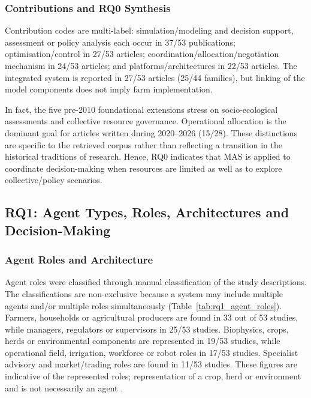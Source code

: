 \documentclass[11pt,a4paper]{article}
\begin{document}
\subsubsection{Contributions and RQ0 Synthesis}

Contribution codes are multi-label: simulation/modeling and decision support, assessment or policy analysis each occur in 37/53 publications; optimisation/control in 27/53 articles; coordination/allocation/negotiation mechanism in 24/53 articles; and platforms/architectures in 22/53 articles. The integrated system is reported in 27/53 articles (25/44 families), but linking of the model components does not imply farm implementation.

In fact, the five pre-2010 foundational extensions stress on socio-ecological
assessments and collective resource governance. Operational
allocation is the dominant goal for articles written during 2020–2026 (15/28). These distinctions are specific to the retrieved corpus rather than reflecting a transition in the historical traditions of research. Hence, RQ0 indicates that MAS is applied to coordinate decision-making when resources are limited as well as to explore collective/policy scenarios.




\subsection{RQ1: Agent Types, Roles, Architectures and Decision-Making}

\subsubsection{Agent Roles and Architecture}

Agent roles were classified through manual classification of the study descriptions. The classifications are non-exclusive because a system may include multiple agents and/or multiple roles simultaneously (Table~\ref{tab:rq1_agent_roles}). Farmers, households or agricultural producers are found in 33 out of 53 studies, while managers, regulators or supervisors in 25/53 studies. Biophysics, crops, herds
or environmental components are represented in 19/53 studies, while operational field, irrigation, workforce or robot roles in 17/53 studies. Specialist advisory and market/trading roles are found in 11/53 studies. These figures are indicative of the represented roles; representation of a crop, herd or environment and is not necessarily an agent \parencite{gaudou_maelia_2014,harman_multi-agent_2022,
t_shanteer_cownet-ai_2026}.
\end{document}
